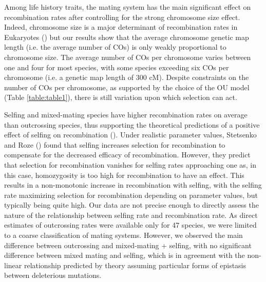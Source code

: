 \documentclass{article}
\begin{document}
Among life history traits, the mating system has the main significant effect on recombination rates after controlling for the strong chromosome size effect. Indeed, chromosome size is a major determinant of recombination rates in Eukaryotes (\cite{brazierDiversityDeterminantsRecombination2022b,stapleyVariationRecombinationFrequency2017,haenelMetaanalysisChromosomescaleCrossover2018}) but our results show that the average chromosome genetic map length (i.e. the average number of COs) is only weakly proportional to chromosome size. The average number of COs per chromosome varies between one and four for most species, with some species exceeding six COs per chromosome (i.e. a genetic map length of 300 cM). Despite constraints on the number of COs per chromosome, as supported by the choice of the OU model (Table \ref{table:table1}), there is still variation upon which selection can act.


Selfing and mixed-mating species have higher recombination rates on average than outcrossing species, thus supporting the theoretical predictions of a positive effect of selfing on recombination (\cite{rozeSelfFertilizationEvolutionRecombination2005,stetsenkoEvolutionRecombinationSelffertilizing2022}). Under realistic parameter values, Stetsenko and Roze (\citeyear{stetsenkoEvolutionRecombinationSelffertilizing2022}) found that selfing increases selection for recombination to compensate for the decreased efficacy of recombination. However, they predict that selection for recombination vanishes for selfing rates approaching one as, in this case, homozygosity is too high for recombination to have an effect. This results in a non-monotonic increase in recombination with selfing, with the selfing rate maximizing selection for recombination depending on parameter values, but typically being quite high. Our data are not precise enough to directly assess the nature of the relationship between selfing rate and recombination rate. As direct estimates of outcrossing rates were available only for 47 species, we were limited to a coarse classification of mating systems. However, we observed the main difference between outcrossing and mixed-mating + selfing, with no significant difference between mixed mating and selfing, which is in agreement with the non-linear relationship predicted by theory assuming particular forms of epistasis between deleterious mutations.
\end{document}
